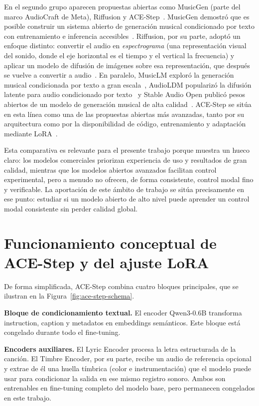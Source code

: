 \documentclass[%
    school=etsisi,%
    type=pfg,%
    degree=61CD,%
]{upm-report}
\begin{document}
En el segundo grupo aparecen propuestas abiertas como MusicGen (parte del marco AudioCraft de Meta), Riffusion y ACE-Step~\cite{copet2023simple,riffusion2022,ace_step2025}. MusicGen demostr\'o que es posible construir un sistema abierto de generaci\'on musical condicionado por texto con entrenamiento e inferencia accesibles~\cite{copet2023simple}. Riffusion, por su parte, adopt\'o un enfoque distinto: convertir el audio en \emph{espectrograma} (una representaci\'on visual del sonido, donde el eje horizontal es el tiempo y el vertical la frecuencia) y aplicar un modelo de difusi\'on de im\'agenes sobre esa representaci\'on, que despu\'es se vuelve a convertir a audio~\cite{riffusion2022}. En paralelo, MusicLM explor\'o la generaci\'on musical condicionada por texto a gran escala~\cite{agostinelli2023musiclm}, AudioLDM populariz\'o la difusi\'on latente para audio condicionado por texto~\cite{liu2023audioldm} y Stable Audio Open public\'o pesos abiertos de un modelo de generaci\'on musical de alta calidad~\cite{evans2024stableaudio}. ACE-Step se sit\'ua en esta l\'inea como una de las propuestas abiertas m\'as avanzadas, tanto por su arquitectura como por la disponibilidad de c\'odigo, entrenamiento y adaptaci\'on mediante LoRA~\cite{ace_step2025}.

Esta comparativa es relevante para el presente trabajo porque muestra un hueco claro: los modelos comerciales priorizan experiencia de uso y resultados de gran calidad, mientras que los modelos abiertos avanzados facilitan control experimental, pero a menudo no ofrecen, de forma consistente, control modal fino y verificable. La aportaci\'on de este \'ambito de trabajo se sit\'ua precisamente en ese punto: estudiar si un modelo abierto de alto nivel puede aprender un control modal consistente sin perder calidad global.

\section{Funcionamiento conceptual de ACE-Step y del ajuste LoRA}

De forma simplificada, ACE-Step combina cuatro bloques principales, que se ilustran en la Figura~\ref{fig:ace-step-schema}.

\textbf{Bloque de condicionamiento textual.} El encoder Qwen3-0.6B transforma instruction, caption y metadatos en embeddings sem\'anticos. Este bloque est\'a congelado durante todo el fine-tuning.

\textbf{Encoders auxiliares.} El Lyric Encoder procesa la letra estructurada de la canci\'on. El Timbre Encoder, por su parte, recibe un audio de referencia opcional y extrae de \'el una huella t\'imbrica (color e instrumentaci\'on) que el modelo puede usar para condicionar la salida en ese mismo registro sonoro. Ambos son entrenables en fine-tuning completo del modelo base, pero permanecen congelados en este trabajo.
\end{document}
